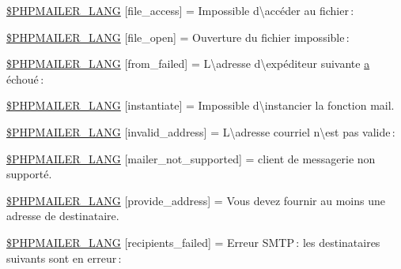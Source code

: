 \begin{DoxyCompactItemize}
\item 
\hyperlink{phpmailer_8lang-fr_8php_a7e83349023b856ef9e5c46e30ae6d51e}{\$\+P\+H\+P\+M\+A\+I\+L\+E\+R\+\_\+\+L\+A\+NG} \mbox{[}\textquotesingle{}file\+\_\+access\textquotesingle{}\mbox{]} = \textquotesingle{}Impossible d\textbackslash{}\textquotesingle{}accéder au fichier \+: \textquotesingle{}
\item 
\hyperlink{phpmailer_8lang-fr_8php_a28d1a6517bf4c942a0ddd506188ad2e0}{\$\+P\+H\+P\+M\+A\+I\+L\+E\+R\+\_\+\+L\+A\+NG} \mbox{[}\textquotesingle{}file\+\_\+open\textquotesingle{}\mbox{]} = \textquotesingle{}Ouverture du fichier impossible \+: \textquotesingle{}
\item 
\hyperlink{phpmailer_8lang-fr_8php_adf832ae12155a09be077c6d5e4fd7e22}{\$\+P\+H\+P\+M\+A\+I\+L\+E\+R\+\_\+\+L\+A\+NG} \mbox{[}\textquotesingle{}from\+\_\+failed\textquotesingle{}\mbox{]} = \textquotesingle{}L\textbackslash{}\textquotesingle{}adresse d\textbackslash{}\textquotesingle{}expéditeur suivante \hyperlink{_chart_8min_8js_aef3b685c08bc6c76c8e729bd0e93901d}{a} échoué \+: \textquotesingle{}
\item 
\hyperlink{phpmailer_8lang-fr_8php_ad58dde16780f4770ccf4dd282ea1f5ad}{\$\+P\+H\+P\+M\+A\+I\+L\+E\+R\+\_\+\+L\+A\+NG} \mbox{[}\textquotesingle{}instantiate\textquotesingle{}\mbox{]} = \textquotesingle{}Impossible d\textbackslash{}\textquotesingle{}instancier la fonction mail.\textquotesingle{}
\item 
\hyperlink{phpmailer_8lang-fr_8php_a42d61bcea4c79599ecb44fd062f54d47}{\$\+P\+H\+P\+M\+A\+I\+L\+E\+R\+\_\+\+L\+A\+NG} \mbox{[}\textquotesingle{}invalid\+\_\+address\textquotesingle{}\mbox{]} = \textquotesingle{}L\textbackslash{}\textquotesingle{}adresse courriel n\textbackslash{}\textquotesingle{}est pas valide \+: \textquotesingle{}
\item 
\hyperlink{phpmailer_8lang-fr_8php_aa2ebcb8833ee83a7ad67401c4bb3a6ad}{\$\+P\+H\+P\+M\+A\+I\+L\+E\+R\+\_\+\+L\+A\+NG} \mbox{[}\textquotesingle{}mailer\+\_\+not\+\_\+supported\textquotesingle{}\mbox{]} = \textquotesingle{} client de messagerie non supporté.\textquotesingle{}
\item 
\hyperlink{phpmailer_8lang-fr_8php_a8b97897c2406b7392b056f375feeefbb}{\$\+P\+H\+P\+M\+A\+I\+L\+E\+R\+\_\+\+L\+A\+NG} \mbox{[}\textquotesingle{}provide\+\_\+address\textquotesingle{}\mbox{]} = \textquotesingle{}Vous devez fournir au moins une adresse de destinataire.\textquotesingle{}
\item 
\hyperlink{phpmailer_8lang-fr_8php_a7589d30bb9b368327c2df015f3e6bcba}{\$\+P\+H\+P\+M\+A\+I\+L\+E\+R\+\_\+\+L\+A\+NG} \mbox{[}\textquotesingle{}recipients\+\_\+failed\textquotesingle{}\mbox{]} = \textquotesingle{}Erreur S\+M\+T\+P \+: les destinataires suivants sont en erreur \+: \textquotesingle{}

\end{DoxyCompactItemize}
